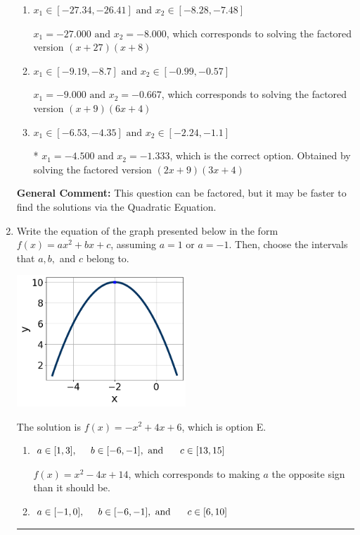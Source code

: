 \documentclass{extbook}[14pt]
\newcommand{\litem}[1]{\item #1

\rule{\textwidth}{0.4pt}}
\begin{document}
\begin{enumerate}
{\begin{enumerate}[label=\Alph*.]
$x_1 = -2.667 \text{ and } x_2 = -2.250$, which corresponds to solving the factored version $(3x + 8)(2x + 4)$
\item \( x_1 \in [-27.34, -26.41] \text{ and } x_2 \in [-8.28, -7.48] \)

$x_1 = -27.000 \text{ and } x_2 = -8.000$, which corresponds to solving the factored version $(x + 27)(x + 8)$
\item \( x_1 \in [-9.19, -8.7] \text{ and } x_2 \in [-0.99, -0.57] \)

$x_1 = -9.000 \text{ and } x_2 = -0.667$, which corresponds to solving the factored version $(x + 9)(6x + 4)$
\item \( x_1 \in [-6.53, -4.35] \text{ and } x_2 \in [-2.24, -1.1] \)

* $x_1 = -4.500 \text{ and } x_2 = -1.333$, which is the correct option. Obtained by solving the factored version $(2x + 9)(3x + 4)$
\end{enumerate}

\textbf{General Comment:} This question can be factored, but it may be faster to find the solutions via the Quadratic Equation.
}
\litem{
Write the equation of the graph presented below in the form $f(x)=ax^2+bx+c$, assuming  $a=1$ or $a=-1$. Then, choose the intervals that $a, b,$ and $c$ belong to.

\begin{center}
    \includegraphics[width=0.5\textwidth]{../Figures/quadraticGraphToEquationCopyA.png}
\end{center}




The solution is \( f(x) = -x^{2} +4 x + 6 \), which is option E.\begin{enumerate}[label=\Alph*.]
\item \( a \in [1, 3], \hspace*{5mm} b \in [-6, -1], \text{ and } \hspace*{5mm} c \in [13, 15] \)

$f(x)=x^{2} -4 x + 14$, which corresponds to making $a$ the opposite sign than it should be.
\item \( a \in [-1, 0], \hspace*{5mm} b \in [-6, -1], \text{ and } \hspace*{5mm} c \in [6, 10] \)


\end{enumerate}}
\end{enumerate}
\end{document}
